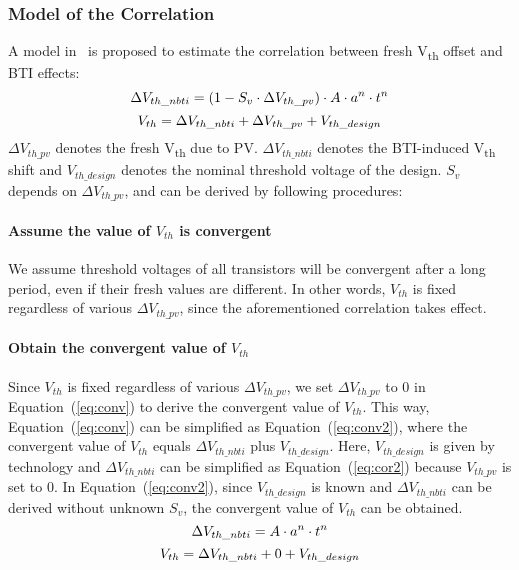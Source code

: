 \subsubsection{Model of the Correlation}
A model in~\cite{gomez2016early} is proposed to estimate the correlation between fresh V\textsubscript{th} offset and BTI effects:
\begin{equation}
	\centering
	\fontsize{9}{9} \selectfont
	\Delta V_{th\_nbti} = (1 - S_{v} \cdot \Delta V_{th\_pv})  \cdot A \cdot a^n \cdot t^n
	\label{eq:cor}
\end{equation}
\begin{equation}
	\centering
	\fontsize{9}{9} \selectfont
	V_{th} = \Delta V_{th\_nbti} + \Delta V_{th\_pv} + V_{th\_design}
	\label{eq:conv}
\end{equation}
$\Delta V_{th\_pv}$ denotes the fresh V\textsubscript{th} due to PV. $\Delta V_{th\_nbti}$ denotes the BTI-induced V\textsubscript{th} shift and $V_{th\_design}$ denotes the nominal threshold voltage of the design. $S_{v}$ depends on $\Delta V_{th\_pv}$, and can be derived by following procedures:

\paragraph{Assume the value of $V_{th}$ is convergent}
We assume threshold voltages of all transistors will be convergent after a long period, even if their fresh values are different. In other words, $V_{th}$ is fixed regardless of various $\Delta V_{th\_pv}$, since the aforementioned correlation takes effect. 

\paragraph{Obtain the convergent value of $V_{th}$}
Since $V_{th}$ is fixed regardless of various $\Delta V_{th\_pv}$, we set $\Delta V_{th\_pv}$ to 0 in Equation~(\ref{eq:conv}) to derive the convergent value of $V_{th}$. This way, Equation~(\ref{eq:conv}) can be simplified as Equation~(\ref{eq:conv2}), where the convergent value of $V_{th}$ equals $\Delta V_{th\_nbti}$ plus $V_{th\_design}$. Here, $V_{th\_design}$ is given by technology and $\Delta V_{th\_nbti}$ can be simplified as Equation~(\ref{eq:cor2}) because $V_{th\_pv}$ is set to 0. In Equation~(\ref{eq:conv2}), since $V_{th\_design}$ is known and $\Delta V_{th\_nbti}$ can be derived without unknown $S_{v}$, the convergent value of $V_{th}$ can be obtained.
\begin{equation}
	\centering
	\fontsize{9}{9} \selectfont
	\Delta V_{th\_nbti} = A \cdot a^n \cdot t^n
	\label{eq:cor2}
\end{equation}
\begin{equation}
	\centering
	\fontsize{9}{9} \selectfont
	V_{th} = \Delta V_{th\_nbti} + 0 + V_{th\_design}
	\label{eq:conv2}
\end{equation}
